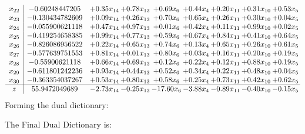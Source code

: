 \documentclass[8pt]{article}
\begin{document}
\[\begin{array}{c| c c@{\hskip 2pt} c@{\hskip 2pt} c@{\hskip 2pt} c@{\hskip 2pt} c@{\hskip 2pt} c@{\hskip 2pt} c@{\hskip 2pt} }
 x_{22}   &  -0.60248447205 & +  0.35 x_{14} & +  0.78 x_{13} & +  0.69 x_{6} & +  0.44 x_{4} & +  0.20 x_{11} & +  0.31 x_{10} & +  0.53 x_{5}\\
 x_{23}   &  -0.130434782609 & +  0.09 x_{14} & +  0.26 x_{13} & +  0.70 x_{6} & +  0.65 x_{4} & +  0.26 x_{11} & +  0.30 x_{10} & +  0.04 x_{5}\\
 x_{24}   &  -0.055900621118 & +  0.47 x_{14} & +  0.97 x_{13} & +  0.01 x_{6} & +  0.42 x_{4} & +  0.11 x_{11} & +  0.99 x_{10} & +  0.02 x_{5}\\
 x_{25}   &  -0.419254658385 & +  0.99 x_{14} & +  0.77 x_{13} & +  0.59 x_{6} & +  0.67 x_{4} & +  0.84 x_{11} & +  0.41 x_{10} & +  0.64 x_{5}\\
 x_{26}   &  -0.826086956522 & +  0.22 x_{14} & +  0.65 x_{13} & +  0.74 x_{6} & +  0.13 x_{4} & +  0.65 x_{11} & +  0.26 x_{10} & +  0.61 x_{5}\\
 x_{27}   &  -0.577639751553 & +  0.81 x_{14} & +  0.01 x_{13} & +  0.80 x_{6} & +  0.03 x_{4} & +  0.16 x_{11} & +  0.20 x_{10} & +  0.19 x_{5}\\
 x_{28}   &  -0.55900621118 & +  0.66 x_{14} & +  0.69 x_{13} & +  0.12 x_{6} & +  0.22 x_{4} & +  0.12 x_{11} & +  0.88 x_{10} & +  0.19 x_{5}\\
 x_{29}   &  -0.611801242236 & +  0.93 x_{14} & +  0.44 x_{13} & +  0.52 x_{6} & +  0.34 x_{4} & +  0.22 x_{11} & +  0.48 x_{10} & +  0.04 x_{5}\\
 x_{30}   &  -0.363354037267 & +  0.53 x_{14} & +  0.80 x_{13} & +  0.58 x_{6} & +  0.25 x_{4} & +  0.73 x_{11} & +  0.42 x_{10} & +  0.62 x_{5}\\
\hline
z    &  55.9472049689 & -2.73 x_{14} & -0.25 x_{13} & -17.60 x_{6} & -3.88 x_{4} & -0.89 x_{11} & -0.40 x_{10} & -0.15 x_{5}\\
\end{array}\]
Forming the dual dictionary:

The Final Dual Dictionary is: 
\end{document}
